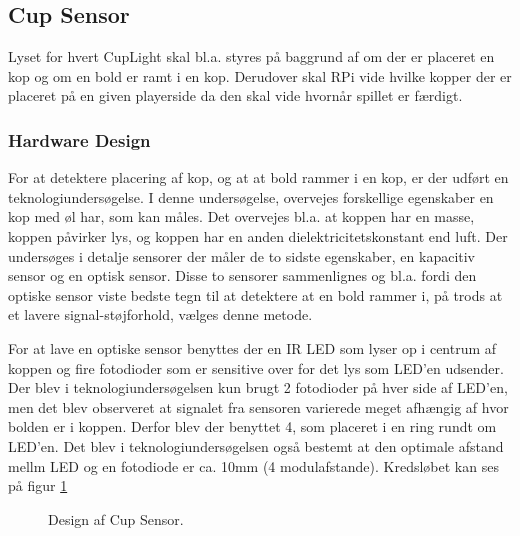 \documentclass[Rapport/Rapport_main.tex]{subfiles}
\begin{document}
\subsection{Cup Sensor}
Lyset for hvert CupLight skal bl.a. styres på baggrund af om der er placeret en kop og om en bold er ramt i en kop. Derudover skal RPi vide hvilke kopper der er placeret på en given playerside da den skal vide hvornår spillet er færdigt.
\subsubsection{Hardware Design}
For at detektere placering af kop, og at at bold rammer i en kop, er der udført en teknologiundersøgelse. I denne undersøgelse, overvejes forskellige egenskaber en kop med øl har, som kan måles. Det overvejes bl.a. at koppen har en masse, koppen påvirker lys, og koppen har en anden dielektricitetskonstant end luft. Der undersøges i detalje sensorer der måler de to sidste egenskaber, en kapacitiv sensor og en optisk sensor. Disse to sensorer sammenlignes og bl.a. fordi den optiske sensor viste bedste tegn til at detektere at en bold rammer i, på trods at et lavere signal-støjforhold, vælges denne metode.

For at lave en optiske sensor benyttes der en IR LED som lyser op i centrum af koppen og fire fotodioder som er sensitive over for det lys som LED'en udsender. Der blev i teknologiundersøgelsen kun brugt 2 fotodioder på hver side af LED'en, men det blev observeret at signalet fra sensoren varierede meget afhængig af hvor bolden er i koppen. Derfor blev der benyttet 4, som placeret i en ring rundt om LED'en. Det blev i teknologiundersøgelsen også bestemt at den optimale afstand mellm LED og en fotodiode er ca. 10mm (4 modulafstande). Kredsløbet kan ses på figur \ref{fig:CupSensorDesign}  
\begin{figure}[H]
    \centering
    \caption{Design af Cup Sensor.}
    \label{fig:CupSensorDesign}
\end{figure}
\end{document}
